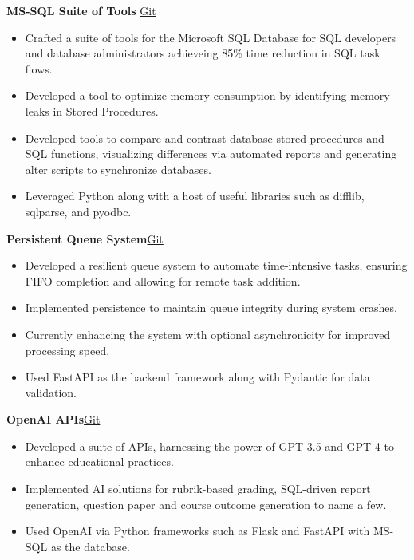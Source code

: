 \documentclass[a4paper]{article}
\begin{document}
{\textbf{MS-SQL Suite of Tools }}\hfill \href{https://github.com/swarnimcodes/Sequel}{Git}\\
\begin{itemize} %
    \item Crafted a suite of tools for the Microsoft SQL Database for SQL developers 
    and database administrators achieveing
    85\% time reduction in SQL task flows. \\
    \item Developed a tool to optimize memory consumption by identifying memory leaks in Stored Procedures. \\
    \item Developed tools to compare and contrast database stored procedures and SQL functions,
    visualizing differences via automated reports and generating alter scripts to synchronize databases. \\
    \item Leveraged Python along with a host of useful libraries such as difflib, sqlparse, and pyodbc. \\
\end{itemize}
\vspace*{2mm}

{\textbf{Persistent Queue System}}\hfill \href{https://github.com/swarnimcodes/kafkaesqueue}{Git}\\
\begin{itemize} 
    \item Developed a resilient queue system to automate time-intensive tasks,
    ensuring FIFO completion and allowing for remote task addition. \\
    \item Implemented persistence to maintain queue integrity during system crashes. \\
    \item Currently enhancing the system with optional asynchronicity for improved
    processing speed. \\
    \item Used FastAPI as the backend framework along with Pydantic for data validation. \\
\end{itemize}

\vspace*{2mm}

{\textbf{OpenAI APIs}}\hfill \href{https://github.com/swarnimcodes/openai-gen-co-and-qp}{Git}\\
\begin{itemize} 
    \item Developed a suite of APIs, harnessing the power of GPT-3.5 and GPT-4
    to enhance educational practices.\\
    \item Implemented AI solutions for rubrik-based grading, SQL-driven report generation,
    question paper and course outcome generation to name a few. \\
    \item Used OpenAI via Python frameworks such as Flask and FastAPI with MS-SQL as the database. \\
\end{itemize}
\vspace*{2mm}
\end{document}
